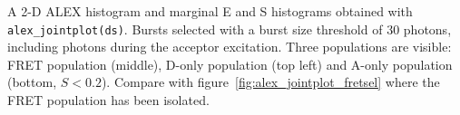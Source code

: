 \label{fig:alex_jointplot} A 2-D ALEX histogram and marginal E and S histograms obtained with \texttt{alex\_jointplot(ds)}. Bursts selected with a burst size threshold of 30 photons, including photons during the acceptor excitation. Three populations are visible: FRET population (middle), D-only population (top left) and A-only population (bottom, $S < 0.2$). Compare with figure~\ref{fig:alex_jointplot_fretsel} where the 
FRET population has been isolated.
